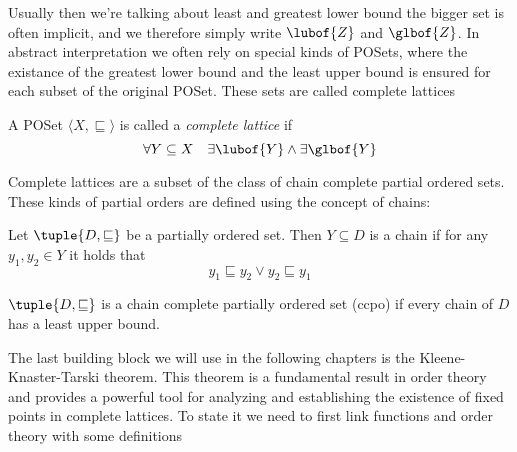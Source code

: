 Usually then we're talking about least and greatest lower bound the
bigger set is often implicit, and we therefore simply write
\(\lubof{Z}\) and \(\glbof{Z}\).  In abstract interpretation we often
rely on special kinds of POSets, where the existance of the greatest
lower bound and the least upper bound is ensured for each subset of
the original POSet. These sets are called complete lattices

\begin{definition}
  A POSet \(\langle X, \sqsubseteq\rangle\) is called a \emph{complete
  lattice} if \[\forall Y \subseteq X \quad \exists \lubof{Y} \wedge
  \exists \glbof{Y}\]
\end{definition}

Complete lattices are a subset of the class of chain complete partial
ordered sets. These kinds of partial orders are defined using the
concept of chains:

\begin{definition}[Chain]
  Let \(\tuple{D, \sqsubseteq}\) be a partially ordered set. Then
  \(Y\subseteq D\) is a chain if for any \(y_1, y_2 \in Y\) it holds
  that
  \begin{equation*}
    y_1 \sqsubseteq y_2 \vee y_2 \sqsubseteq y_1
  \end{equation*}
\end{definition}

\begin{definition}
  \(\tuple{D, \sqsubseteq}\) is a chain complete partially ordered set
  (ccpo) if every chain of \(D\) has a least upper bound.
\end{definition}



The last building block we will use in the following chapters is the
Kleene-Knaster-Tarski theorem. This theorem is a fundamental result in
order theory and provides a powerful tool for analyzing and
establishing the existence of fixed points in complete lattices. To
state it we need to first link functions and order theory with some
definitions

